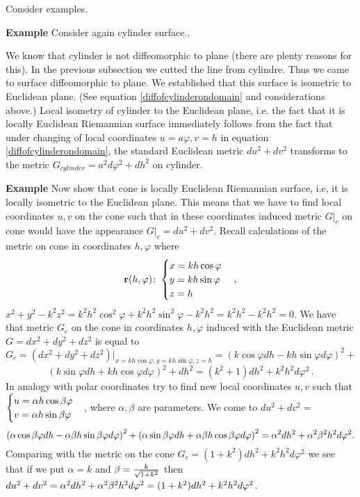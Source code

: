 \documentclass[12pt]{article}
\theoremstyle{theorem}
\numberwithin{equation}{section}
\begin{document}
{\m






   Consider examples.

{\bf Example} Consider again cylinder surface..



 We know that cylinder is not diffeomorphic to plane
(there are plenty reasons for this).
 In the previous subsection we cutted the line from cylindre.
Thus we came to surface diffeomorphic to plane. We established that
this surface is isometric to Euclidean plane. (See equation
 \eqref{diffofcylinderondomain} and considerations above.)
Local isometry of cylinder to the Euclidean plane, i.e. the fact
that it is locally Euclidean Riemannian surface
 immediately follows from the fact
that under changing of local coordinates $u=a\varphi, v=h$
  in equation \eqref{diffofcylinderondomain},
the standard Euclidean metric
$du^2+dv^2$ transforms to the metric
$G_{cylinder}=a^2d\varphi^2+dh^2$ on cylinder.



  \m

{\bf Example}
Now show that cone is locally Euclidean Riemannian surface, i.e, it is
locally isometric to the Euclidean  plane.
This means that we have to find local coordinates $u,v$ on the cone such that in these coordinates
  induced metric $G\vert_c$ on cone would have the appearance $G\vert_c=du^2+dv^2$.  Recall calculations of the metric on cone in
coordinates $h,\varphi$ where
             $$
          {\bf r}(h,\varphi)\colon
          \begin{cases}
          x=kh\cos\varphi\cr
          y=kh\sin\varphi\cr
          z=h\cr
          \end{cases},
             $$
$x^2+y^2-k^2z^2=k^2h^2\cos^2\varphi+k^2h^2\sin^2\varphi-
k^2h^2=k^2h^2-k^2h^2=0$.
 We have that metric $G_c$ on the cone in coordinates
$h,\varphi$  induced with
the Euclidean metric $G=dx^2+dy^2+dz^2$ is equal to
                $$
            G_c=\left(dx^2+dy^2+dz^2\right)
\big\vert_{x=kh\cos\varphi, y=kh\sin\varphi, z=h}=
            (k\cos\varphi dh-kh\sin\varphi d\varphi)^2+
            $$
            $$
            (k\sin\varphi dh+kh\cos\varphi d\varphi)^2+dh^2=
            (k^2+1)dh^2+k^2h^2d\varphi^2\,.
                $$
In analogy with polar coordinates try to find new local coordinates $u,v$
such that $\begin{cases} u=\alpha h\cos \beta\varphi\cr v=\alpha h\sin \beta\varphi\end{cases}$,
where $\alpha, \beta$ are parameters. We come to  $du^2+dv^2=$
             $$
    \left(\alpha\cos\beta\varphi dh-\alpha\beta h\sin\beta\varphi d\varphi\right)^2+
  \left(\alpha\sin\beta\varphi dh+\alpha\beta h\cos\beta\varphi d\varphi\right)^2=
  \alpha^2 dh^2+\alpha^2\beta^2 h^2d\varphi^2.
             $$
Comparing with the metric on the cone $G_c=(1+k^2)dh^2+k^2h^2d\varphi^2$  we see that if we put $\alpha=k$ and
$\beta={k\over \sqrt{1+k^2}}$
then $du^2+dv^2=\alpha^2 dh^2+\alpha^2\beta^2 h^2d\varphi^2=(1+k^2)dh^2+k^2h^2d\varphi^2$.

}
\end{document}
